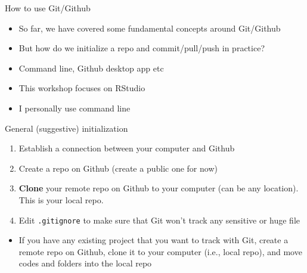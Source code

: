 \documentclass[handout,pdftex,10pt,aspectratio=169]{beamer}
\begin{document}
\begin{frame}{How to use Git/Github}
  \begin{itemize}[<+->]
    \item So far, we have covered some fundamental concepts around Git/Github
    \item But how do we initialize a repo and commit/pull/push in practice?
    \item Command line, Github desktop app etc
    \item This workshop focuses on RStudio
    \item I personally use command line
  \end{itemize}
\end{frame}


\begin{frame}{General (suggestive) initialization}
  \begin{enumerate}[<+->]
    \item Establish a connection between your computer and Github
    \item Create a repo on Github (create a public one for now)
    \item \textbf{Clone} your remote repo on Github to your computer (can be any location).
    This is your local repo.
    \item Edit \texttt{.gitignore} to make sure that Git won't track any sensitive or huge file
  \end{enumerate}
  \medskip
  \begin{itemize}[<+->]
    \item If you have any existing project that you want to track with Git, create a remote repo 
    on Github, clone it to your computer (i.e., local repo), and move codes and folders into the local repo
  \end{itemize}
\end{frame}
\end{document}
